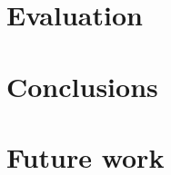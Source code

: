 \documentclass{article}
\begin{document}
\section{Evaluation}\label{sec:eval}




\section{Conclusions}\label{sec:conclusions}



\section{Future work}\label{sec:futurework}




\printbibliography
\end{document}
